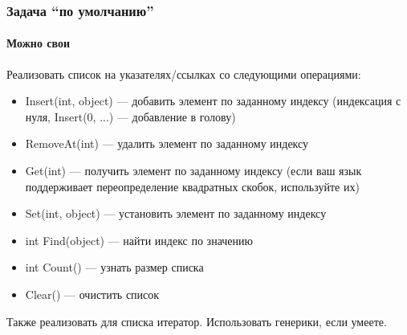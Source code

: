 \documentclass{../../slides-style}
\begin{document}
    \begin{frame}
        \frametitle{Задача ``по умолчанию''}
        \framesubtitle{Можно свои}
        Реализовать список на указателях/ссылках со следующими операциями:
        \begin{itemize}
            \item Insert(int, object) --- добавить элемент по заданному индексу (индексация с нуля, Insert(0, ...) --- добавление в голову)
            \item RemoveAt(int) --- удалить элемент по заданному индексу
            \item Get(int) --- получить элемент по заданному индексу (если ваш язык поддерживает переопределение квадратных скобок, используйте их)
            \item Set(int, object) --- установить элемент по заданному индексу
            \item int Find(object) --- найти индекс по значению
            \item int Count() --- узнать размер списка
            \item Clear() --- очистить список
        \end{itemize}
        Также реализовать для списка итератор. Использовать генерики, если умеете.
    \end{frame}
\end{document}
